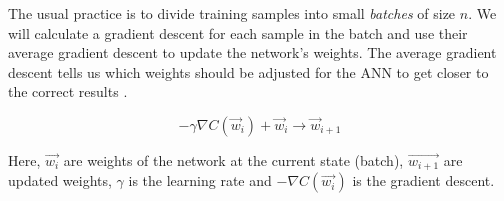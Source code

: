 The usual practice is to divide training samples into small \textit{batches} of size $n$. We will calculate a gradient descent for each sample in the batch and use their average gradient descent to update the network's weights. The average gradient descent tells us which weights should be adjusted for the ANN to get closer to the correct results \cite{birlliantbackprop}.

\begin{equation}
    {- \gamma \nabla C(\vec{w}_i) + \vec{w}_i \rightarrow \vec{w}_{i+1} }
\end{equation}

Here, $\vec{w_i}$ are weights of the network at the current state (batch), $\vec{w_{i+1}}$ are updated weights, $\gamma$ is the learning rate and $-\nabla C(\vec{w_i})$ is the gradient descent.
